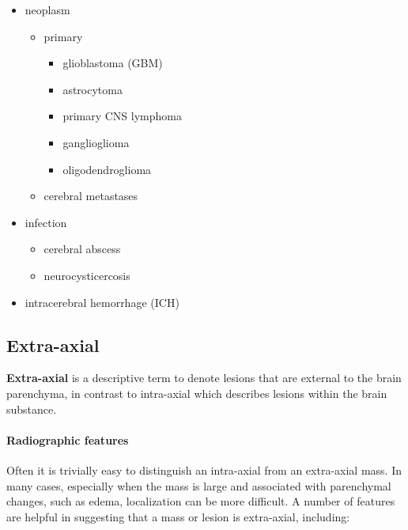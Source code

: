 \begin{itemize}
	\tightlist
	\item
	neoplasm
	
	\begin{itemize}
		\tightlist
		\item
		primary
		
		\begin{itemize}
			\tightlist
			\item
			glioblastoma (GBM)
			\item
			astrocytoma
			\item
			primary CNS lymphoma
			\item
			ganglioglioma
			\item
			oligodendroglioma
		\end{itemize}
		\item
		cerebral metastases
	\end{itemize}
	\item
	infection
	
	\begin{itemize}
		\tightlist
		\item
		cerebral abscess
		\item
		neurocysticercosis
	\end{itemize}
	\item
	intracerebral hemorrhage (ICH)
\end{itemize}


\subsection{Extra-axial}

\textbf{Extra-axial} is a descriptive term to denote lesions that are external to the brain parenchyma, in contrast to intra-axial which describes lesions within the brain substance.

\paragraph{Radiographic features}

Often it is trivially easy to distinguish an intra-axial from an extra-axial mass. In many cases, especially when the mass is large and associated with parenchymal changes, such as edema, localization can be more difficult. A number of features are helpful in suggesting that a mass or lesion is extra-axial, including:

